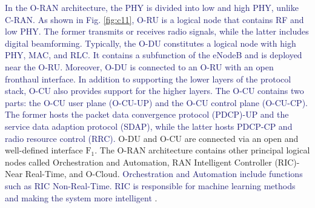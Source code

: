 \documentclass[lettersize,journal]{IEEEtran}
\begin{document}
\textcolor{MidnightBlue}{In the O-RAN architecture, the PHY is divided into low and high PHY, unlike C-RAN. As shown in Fig. \ref{fig:c11}, O-RU is a logical node that contains RF and low PHY. The former transmits or receives radio signals, while the latter includes digital beamforming. Typically, the O-DU constitutes a logical node with high PHY, MAC, and RLC. It contains a subfunction of the eNodeB and is deployed near the O-RU.
Moreover, O-DU is connected to an O-RU with an open fronthaul interface.
In addition to supporting the lower layers of the protocol stack, O-CU also provides support for the higher layers.
The O-CU contains two parts: the O-CU user plane (O-CU-UP) and the O-CU control plane (O-CU-CP). The former hosts the packet data convergence protocol (PDCP)-UP and the service data adaption protocol (SDAP), while the latter hosts PDCP-CP and radio resource control (RRC).}
O-DU and O-CU are connected via an open and well-defined interface $\text{F}_1$.
The O-RAN architecture contains other principal logical nodes called Orchestration and Automation, RAN Intelligent Controller (RIC)- Near Real-Time, and O-Cloud. \textcolor{MidnightBlue}{Orchestration and Automation include functions such as RIC Non-Real-Time. RIC is responsible for machine learning methods and making the system more intelligent}
\cite{gavrilovska2020cloud,niknam2020intelligent,kazemifard2021minimum,both2021system,ORANArch,ORANML,lin2021toward}. 
\end{document}
